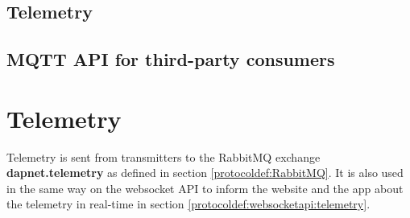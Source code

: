 \subsection{Telemetry}

\subsection{MQTT API for third-party consumers}


\section{Telemetry}
\label{protocoldef:telemetry}
Telemetry is sent from transmitters to the RabbitMQ exchange \textbf{dapnet.telemetry} as defined in section \ref{protocoldef:RabbitMQ}. It is also used in the same way on the websocket API to inform the website and the app about the telemetry in real-time in section \ref{protocoldef:websocketapi:telemetry}.

